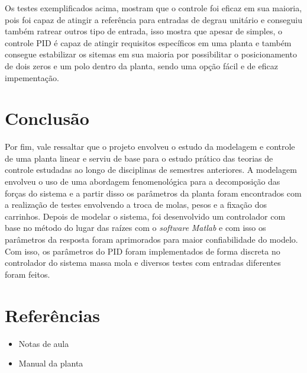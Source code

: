 \documentclass{ifacconf}
\begin{document}
Os testes exemplificados acima, mostram que o controle foi eficaz em sua maioria, pois foi capaz de atingir a referência para entradas de degrau unitário e conseguiu também ratrear outros tipo de entrada,
isso mostra que apesar de simples, o controle PID é capaz de atingir requisitos específicos em uma planta e também consegue estabilizar os sitemas em sua maioria por possibilitar o posicionamento de dois zeros
e um polo dentro da planta, sendo uma opção fácil e de eficaz impementação.    

\section{Conclusão}

Por fim, vale ressaltar que o projeto envolveu o estudo da modelagem e controle de uma planta linear e serviu de base para o estudo prático das teorias de controle estudadas ao longo de disciplinas de semestres anteriores. A modelagem envolveu o uso de uma abordagem fenomenológica para a decomposição das forças do sistema e a partir disso os parâmetros da planta foram encontrados com a realização de testes envolvendo a troca de molas, pesos e a fixação dos carrinhos. Depois de modelar o sistema, foi desenvolvido um controlador com base no método do lugar das raízes com o \textit{software} \textit{Matlab} e com isso os parâmetros da resposta foram aprimorados para maior confiabilidade do modelo. Com isso, os parâmetros do PID foram implementados de forma discreta no controlador do sistema massa mola e diversos testes com entradas diferentes foram feitos.  

\section{Referências}

\begin{itemize}
  \item Notas de aula
  \item Manual da planta
\end{itemize}
\end{document}
